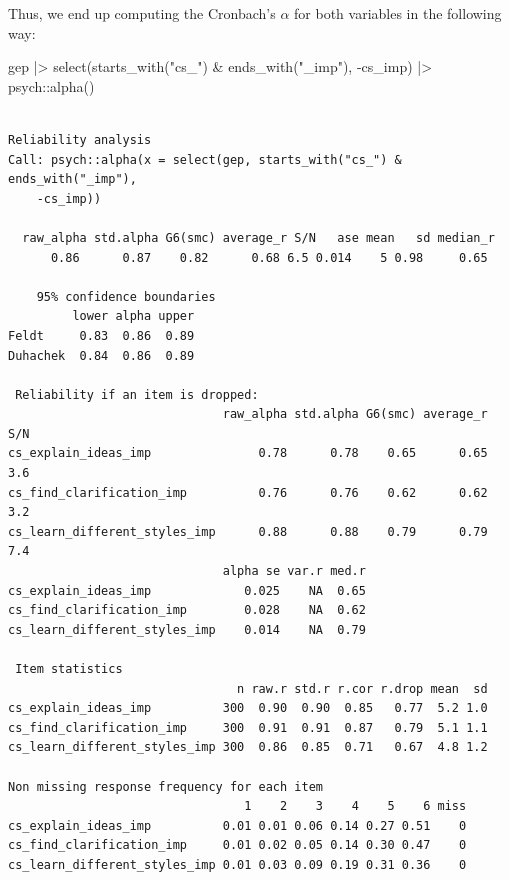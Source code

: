 \documentclass[
  letterpaper,
]{krantz}
\makeatletter
\newenvironment{Shaded}{\begin{snugshade}}{\end{snugshade}}
\newcommand{\FunctionTok}[1]{\textcolor[rgb]{0.28,0.35,0.67}{#1}}
\newcommand{\NormalTok}[1]{\textcolor[rgb]{0.00,0.23,0.31}{#1}}
\newcommand{\SpecialCharTok}[1]{\textcolor[rgb]{0.37,0.37,0.37}{#1}}
\newcommand{\StringTok}[1]{\textcolor[rgb]{0.13,0.47,0.30}{#1}}
\newenvironment{kframe}{%
\medskip{}
\setlength{\fboxsep}{.8em}
 \def\at@end@of@kframe{}%
 \ifinner\ifhmode%
  \def\at@end@of@kframe{\end{minipage}}%
  \begin{minipage}{\columnwidth}%
 \fi\fi%
 \def\FrameCommand##1{\hskip\@totalleftmargin \hskip-\fboxsep
 \colorbox{shadecolor}{##1}\hskip-\fboxsep
     \hskip-\linewidth \hskip-\@totalleftmargin \hskip\columnwidth}%
 \MakeFramed {\advance\hsize-\width
   \@totalleftmargin\z@ \linewidth\hsize
   \@setminipage}}%
 {\par\unskip\endMakeFramed%
 \at@end@of@kframe}
\renewenvironment{Shaded}{\begin{kframe}}{\end{kframe}}
\makeatother
\begin{document}
Thus, we end up computing the Cronbach's \(\alpha\) for both variables
in the following way:

\begin{Shaded}
\begin{Highlighting}[]
\NormalTok{gep }\SpecialCharTok{|\textgreater{}}
  \FunctionTok{select}\NormalTok{(}\FunctionTok{starts\_with}\NormalTok{(}\StringTok{"cs\_"}\NormalTok{) }\SpecialCharTok{\&} \FunctionTok{ends\_with}\NormalTok{(}\StringTok{"\_imp"}\NormalTok{), }\SpecialCharTok{{-}}\NormalTok{cs\_imp) }\SpecialCharTok{|\textgreater{}}
\NormalTok{  psych}\SpecialCharTok{::}\FunctionTok{alpha}\NormalTok{()}
\end{Highlighting}
\end{Shaded}

\begin{verbatim}

Reliability analysis   
Call: psych::alpha(x = select(gep, starts_with("cs_") & ends_with("_imp"), 
    -cs_imp))

  raw_alpha std.alpha G6(smc) average_r S/N   ase mean   sd median_r
      0.86      0.87    0.82      0.68 6.5 0.014    5 0.98     0.65

    95% confidence boundaries 
         lower alpha upper
Feldt     0.83  0.86  0.89
Duhachek  0.84  0.86  0.89

 Reliability if an item is dropped:
                              raw_alpha std.alpha G6(smc) average_r S/N
cs_explain_ideas_imp               0.78      0.78    0.65      0.65 3.6
cs_find_clarification_imp          0.76      0.76    0.62      0.62 3.2
cs_learn_different_styles_imp      0.88      0.88    0.79      0.79 7.4
                              alpha se var.r med.r
cs_explain_ideas_imp             0.025    NA  0.65
cs_find_clarification_imp        0.028    NA  0.62
cs_learn_different_styles_imp    0.014    NA  0.79

 Item statistics 
                                n raw.r std.r r.cor r.drop mean  sd
cs_explain_ideas_imp          300  0.90  0.90  0.85   0.77  5.2 1.0
cs_find_clarification_imp     300  0.91  0.91  0.87   0.79  5.1 1.1
cs_learn_different_styles_imp 300  0.86  0.85  0.71   0.67  4.8 1.2

Non missing response frequency for each item
                                 1    2    3    4    5    6 miss
cs_explain_ideas_imp          0.01 0.01 0.06 0.14 0.27 0.51    0
cs_find_clarification_imp     0.01 0.02 0.05 0.14 0.30 0.47    0
cs_learn_different_styles_imp 0.01 0.03 0.09 0.19 0.31 0.36    0
\end{verbatim}
\end{document}
